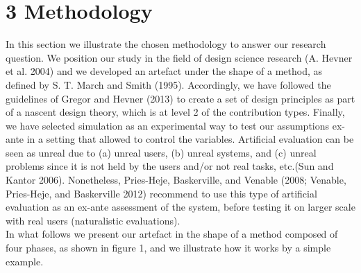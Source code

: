 \documentclass[]{elsarticle} %
\begin{document}
\section{3 Methodology}\label{methodology}

In this section we illustrate the chosen methodology to answer our
research question. We position our study in the field of design science
research (A. Hevner et al. 2004) and we developed an artefact under the
shape of a method, as defined by S. T. March and Smith (1995).
Accordingly, we have followed the guidelines of Gregor and Hevner (2013)
to create a set of design principles as part of a nascent design theory,
which is at level 2 of the contribution types. Finally, we have selected
simulation as an experimental way to test our assumptions ex-ante in a
setting that allowed to control the variables. Artificial evaluation can
be seen as unreal due to (a) unreal users, (b) unreal systems, and (c)
unreal problems since it is not held by the users and/or not real tasks,
etc.(Sun and Kantor 2006). Nonetheless, Pries-Heje, Baskerville, and
Venable (2008; Venable, Pries-Heje, and Baskerville 2012) recommend to
use this type of artificial evaluation as an ex-ante assessment of the
system, before testing it on larger scale with real users (naturalistic
evaluations).\\
In what follows we present our artefact in the shape of a method
composed of four phases, as shown in figure 1, and we illustrate how it
works by a simple example.
\end{document}
